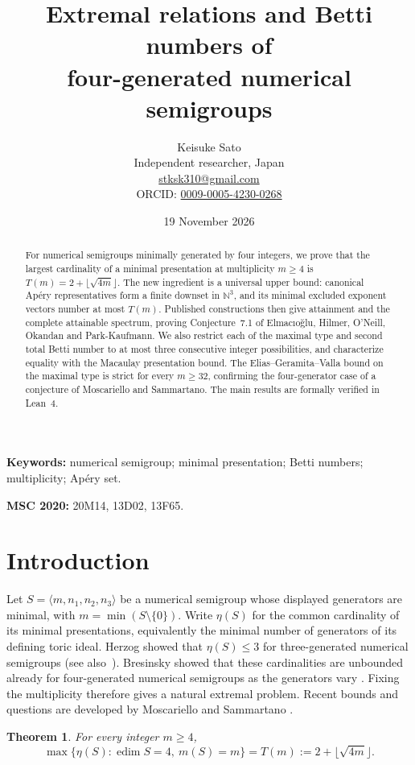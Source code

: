 \documentclass[11pt]{article}
\title{Extremal relations and Betti numbers of\\four-generated numerical semigroups}
\author{Keisuke Sato\\Independent researcher, Japan\\
\href{mailto:stksk310@gmail.com}{stksk310@gmail.com}\\
ORCID: \href{https://orcid.org/0009-0005-4230-0268}{0009-0005-4230-0268}}
\date{19 November 2026}
\newtheorem{theorem}{Theorem}[section]
\theoremstyle{definition}
\theoremstyle{remark}
\theoremstyle{plain}
\DeclareMathOperator{\edim}{edim}
\begin{document}
\maketitle
\begin{abstract}
For numerical semigroups minimally generated by four integers, we prove that
the largest cardinality of a minimal presentation at multiplicity $m\ge4$ is
$T(m)=2+\lfloor\sqrt{4m}\rfloor$.
The new ingredient is a universal upper bound: canonical Ap\'ery
representatives form a finite downset in $\mathbb N^3$, and its minimal
excluded exponent vectors number at most $T(m)$. Published constructions then give attainment
and the complete attainable spectrum, proving Conjecture~7.1 of
Elmac\i{}o\u{g}lu, Hilmer, O'Neill, Okandan and Park-Kaufmann.
We also restrict each of the maximal type and second total Betti number
to at most three consecutive integer possibilities, and characterize
equality with the Macaulay presentation bound. The Elias--Geramita--Valla
bound on the maximal type is strict for every $m\ge32$, confirming the
four-generator case of a conjecture of Moscariello and Sammartano.
The main results are formally verified in Lean~4.
\end{abstract}
\noindent\textbf{Keywords:} numerical semigroup; minimal presentation;
Betti numbers; multiplicity; Ap\'ery set.\par
\smallskip
\noindent\textbf{MSC 2020:} 20M14, 13D02, 13F65.

\section{Introduction}
Let $S=\langle m,n_1,n_2,n_3\rangle$ be a numerical semigroup whose
displayed generators are minimal, with $m=\min(S\setminus\{0\})$.
Write $\eta(S)$ for the common cardinality of its minimal presentations,
equivalently the minimal number of generators of its defining toric ideal.
Herzog showed that $\eta(S)\le3$ for three-generated numerical
semigroups \cite{Herzog70} (see also~\cite{HerzogStamate14}). Bresinsky showed that
these cardinalities are unbounded already for
four-generated numerical semigroups as the generators vary
\cite{Bresinsky75}. Fixing the multiplicity therefore gives a natural
extremal problem. Recent bounds and questions are developed by
Moscariello and Sammartano \cite{MS25,MSSurvey25}.

\begin{theorem}\label{thm:main}
For every integer $m\ge4$,
\[
\max\{\eta(S):\edim S=4,\ m(S)=m\}
=T(m):=2+\lfloor\sqrt{4m}\rfloor.
\]
\end{theorem}
\end{document}
